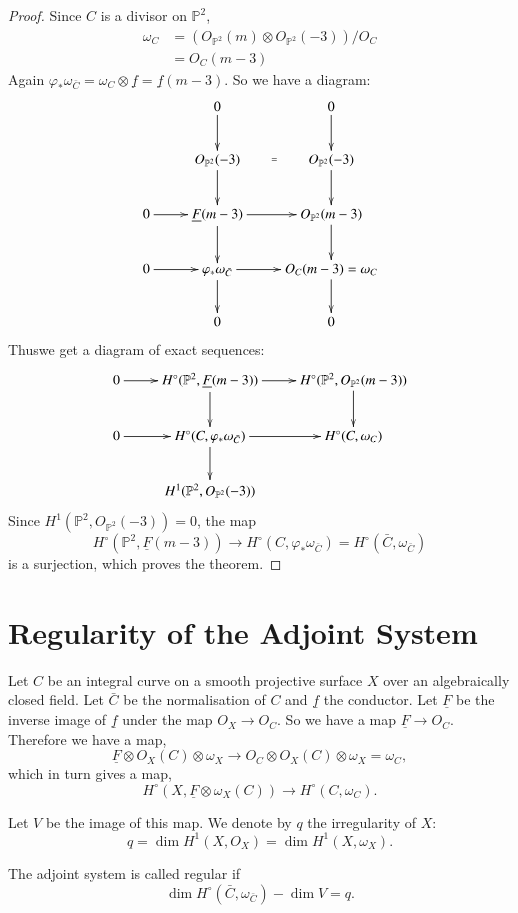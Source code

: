 \begin{proof}
Since $C$ is a divisor on $\mathbb{P}^2$,
\begin{align*}
\omega_C &= (O_{\mathbb{P}^2}(m)\otimes O_{\mathbb{P}^2}(-3))/O_C\\
&= O_C(m-3)
\end{align*}
Again $\varphi_*\omega_{\bar{C}}=\omega_C\otimes\underline{f}=
\underline{f}(m-3)$. So we have a diagram:
\[
\xymatrix{
& 0 \ar[d] &  0 \ar[d]\\
& O_{\mathbb{P}^2}(-3) \ar[d] \ar @{} [r] |{=} & O_{\mathbb{P}^2}(-3)
\ar[d]\\
0 \ar[r] & \underline{F}(m-3) \ar[d] \ar[r] & O_{\mathbb{P}^2}(m-3)
\ar[d]\\ 
0 \ar[r] & \varphi_*\omega_{\bar{C}} \ar[d] \ar[r] & O_C(m-3)=\omega_C
\ar[d]\\
& 0 & 0   
}
\]
Thus\pageoriginale we get a diagram of exact sequences:
\[
\xymatrix{
0 \ar[r] & H^\circ(\mathbb{P}^2,\underline{F}(m-3)) \ar[d] \ar[r] &
H^\circ(\mathbb{P}^2, O_{\mathbb{P}^2}(m-3)) \ar[d]\\
0 \ar[r] & H^\circ(C,\varphi_*\omega_{\bar{C}}) \ar[d] \ar[r] &
H^\circ(C,\omega_C)\\ 
& H^1(\mathbb{P}^2, O_{\mathbb{P}^2}(-3)) & 
}
\]
Since $H^1(\mathbb{P}^2,O_{\mathbb{P}^2}(-3))=0$, the map
$$
H^\circ(\mathbb{P}^2,\underline{F}(m-3))\longrightarrow H^\circ(C,
\varphi_*\omega_{\bar{C}})=H^\circ(\bar{C},\omega_{\bar{C}})
$$
is a surjection, which proves the theorem.
\end{proof}

\section{Regularity of the Adjoint System}\label{chap2:sec9} Let $C$
be an integral curve on a smooth projective surface $X$ over an
algebraically closed field. Let $\bar{C}$ be the normalisation of $C$
and $\underline{f}$ the conductor. Let $\underline{F}$ be the inverse
image of $\underline{f}$ under the map $O_X\longrightarrow O_C$. So we
have a map $\underline{F}\longrightarrow O_C$. Therefore we have a
map,
$$
\underline{F}\otimes O_X(C)\otimes\omega_X\longrightarrow O_C\otimes
O_X(C)\otimes\omega_X=\omega_C,
$$
which in turn gives a map,
$$
H^\circ(X,\underline{F}\otimes\omega_X(C))\longrightarrow H^\circ(C,
\omega_C).
$$

Let $V$ be the image of this map. We denote by $q$ the irregularity of
$X$:
$$
q=\dim H^1(X, O_X)=\dim H^1(X,\omega_X).
$$
\begin{def*}
The adjoint system is called regular if 
$$
\dim H^\circ(\bar{C},\omega_{\bar{C}})-\dim V=q.
$$
\end{def*}

